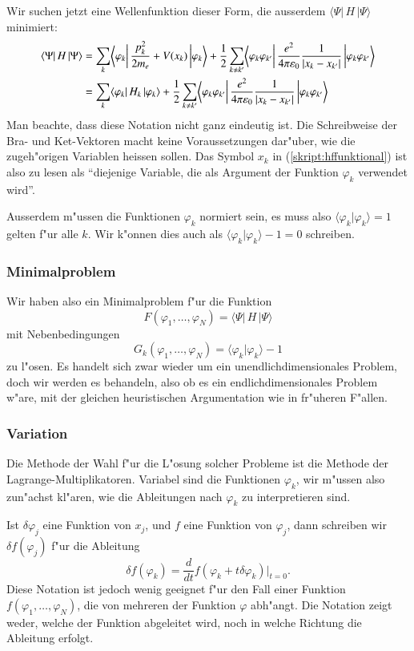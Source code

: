 Wir suchen jetzt eine Wellenfunktion dieser Form, die ausserdem 
$\langle\Psi|\,H\,|\Psi\rangle$ minimiert:
\begin{align}
\langle\Psi|\,H\,|\Psi\rangle
&=
\sum_{k}\biggl\langle \varphi_k\biggl|\,
\frac{p_k^2}{2m_e}+V(x_k)
\,\biggr|\varphi_k\biggr\rangle
+
\frac12
\sum_{k\ne k'}\biggl\langle \varphi_k\varphi_{k'}\biggl|\,
\frac{e^2}{4\pi\varepsilon_0}\frac{1}{|x_k-x_{k'}|}
\,\biggr|\varphi_k\varphi_{k'} \biggl\rangle
\notag
\\
&=\sum_k\langle\varphi_k|\,H_k\,|\varphi_k\rangle
+
\frac12
\sum_{k\ne k'}\biggl\langle \varphi_k\varphi_{k'}\biggl|\,
\frac{e^2}{4\pi\varepsilon_0}\frac{1}{|x_k-x_{k'}|}
\,\biggr|\varphi_k\varphi_{k'} \biggl\rangle
\label{skript:hffunktional}
\end{align}
Man beachte, dass diese Notation nicht ganz eindeutig ist. Die Schreibweise
der Bra- und Ket-Vektoren macht keine Voraussetzungen dar"uber, wie die
zugeh"origen Variablen heissen sollen. Das Symbol $x_k$ in
(\ref{skript:hffunktional}) ist also zu lesen als ``diejenige Variable,
die als Argument der Funktion $\varphi_k$ verwendet wird''.

Ausserdem m"ussen die Funktionen $\varphi_k$ normiert sein, es muss
also $\langle\varphi_k|\varphi_k\rangle=1$ gelten f"ur alle $k$.
Wir k"onnen dies auch als $\langle\varphi_k|\varphi_k\rangle-1=0$
schreiben.

\subsubsection{Minimalproblem}
Wir haben also ein Minimalproblem f"ur die Funktion
\[
F(\varphi_1,\dots,\varphi_N)=\langle\Psi|\,H\,|\Psi\rangle
\]
mit Nebenbedingungen
\[
G_k(\varphi_1,\dots,\varphi_N)=\langle\varphi_k|\varphi_k\rangle-1
\]
zu l"osen.
Es handelt sich zwar wieder um ein unendlichdimensionales Problem,
doch wir werden es behandeln, also ob es ein endlichdimensionales Problem
w"are, mit der gleichen heuristischen Argumentation wie in fr"uheren F"allen.

\subsubsection{Variation}
Die Methode der Wahl f"ur die L"osung solcher Probleme ist die Methode
der Lagrange-Multiplika\-to\-ren. 
Variabel sind die Funktionen $\varphi_k$, wir m"ussen also zun"achst 
kl"aren, wie die Ableitungen nach $\varphi_k$ zu interpretieren sind.

Ist $\delta\varphi_j$ eine Funktion von $x_j$, und $f$ eine Funktion von
$\varphi_j$, dann schreiben wir $\delta f(\varphi_j)$ f"ur die
Ableitung
\[
\delta f(\varphi_k)
=
\frac{d}{dt}f(\varphi_k+t\delta\varphi_k)\bigg|_{t=0}.
\]
Diese Notation ist jedoch wenig geeignet f"ur den Fall einer Funktion
$f(\varphi_1,\dots,\varphi_N)$, die von mehreren der Funktion $\varphi$
abh"angt.
Die Notation zeigt weder, welche der Funktion abgeleitet wird,
noch in welche Richtung die Ableitung erfolgt.

